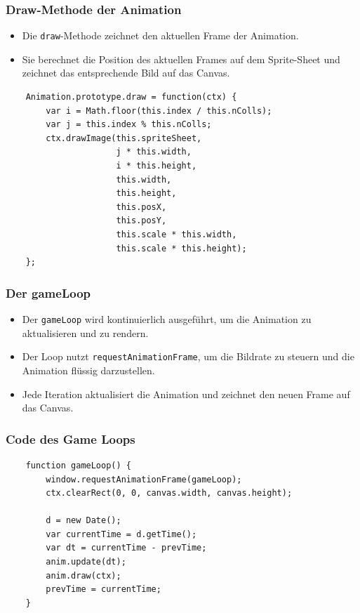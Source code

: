\documentclass{beamer}
\begin{document}
\begin{frame}[fragile]
    \frametitle{Draw-Methode der Animation}
    \begin{itemize}
        \item Die \texttt{draw}-Methode zeichnet den aktuellen Frame der Animation.
        \item Sie berechnet die Position des aktuellen Frames auf dem Sprite-Sheet und zeichnet das entsprechende Bild auf das Canvas.
    \end{itemize}
    \begin{verbatim}
    Animation.prototype.draw = function(ctx) {
        var i = Math.floor(this.index / this.nColls);
        var j = this.index % this.nColls;
        ctx.drawImage(this.spriteSheet, 
                      j * this.width, 
                      i * this.height, 
                      this.width, 
                      this.height, 
                      this.posX, 
                      this.posY, 
                      this.scale * this.width, 
                      this.scale * this.height);
    };
    \end{verbatim}
\end{frame}

\begin{frame}
    \frametitle{Der gameLoop}
    \begin{itemize}
        \item Der \texttt{gameLoop} wird kontinuierlich ausgeführt, um die Animation zu aktualisieren und zu rendern.
        \item Der Loop nutzt \texttt{requestAnimationFrame}, um die Bildrate zu steuern und die Animation flüssig darzustellen.
        \item Jede Iteration aktualisiert die Animation und zeichnet den neuen Frame auf das Canvas.
    \end{itemize}
\end{frame}

\begin{frame}[fragile]
    \frametitle{Code des Game Loops}
    \begin{verbatim}
    function gameLoop() {
        window.requestAnimationFrame(gameLoop);
        ctx.clearRect(0, 0, canvas.width, canvas.height);
        
        d = new Date();
        var currentTime = d.getTime();
        var dt = currentTime - prevTime;
        anim.update(dt);
        anim.draw(ctx);
        prevTime = currentTime;
    }
    \end{verbatim}
\end{frame}
\end{document}
